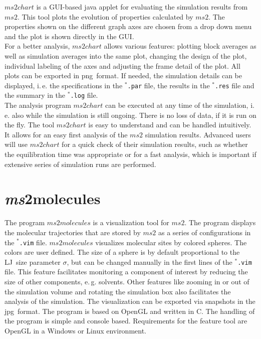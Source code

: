 $ms2chart$ is a GUI-based java applet for evaluating the simulation results from $ms2$. This tool plots the evolution of properties calculated by $ms2$. The properties shown on the different graph axes are chosen from a drop 
down menu and the plot is shown directly in the GUI. \\
For a better analysis, $ms2chart$ allows various features: plotting block averages as well as simulation averages into the same plot, changing the design of the plot, individual labeling of the axes and adjusting the frame detail of the plot. All plots can be exported in png~format. If needed, the simulation details can be displayed, i.\,e. the specifications in the \texttt{$^{*}$\hspace{-3pt}.par} file, the results in the \texttt{$^{*}$\hspace{-3pt}.res} file and the summary in the \texttt{$^{*}$\hspace{-3pt}.log} file. \\
The analysis program $ms2chart$ can be executed at any time of the simulation, i.\,e. also while the simulation is still ongoing. There is no loss of data, if it is run on the fly. The tool $ms2chart$ is easy to understand and can be handled intuitively. It allows for an easy first analysis of the $ms2$ simulation results. Advanced users will use $ms2chart$ for a quick check of their simulation results, such as whether the equilibration time was appropriate or for a fast analysis, which is important if extensive series of simulation runs are performed.


\section{\textit{ms}2molecules}
\label{sec:ms2molecules}
 

The program $ms2molecules$ is a visualization tool for $ms2$. The program displays the molecular trajectories that are stored by $ms2$ as a series of configurations in the \texttt{$^{*}$\hspace{-3pt}.vim} file. $ms2molecules$ visualizes molecular sites by colored spheres. The colors are user defined. The size of a sphere is by default proportional to the LJ~size parameter $\sigma$, but can be changed manually in the first lines of the \texttt{$^{*}$\hspace{-3pt}.vim} file. This feature facilitates monitoring a component of interest by reducing the size of other components, e.\,g. solvents. Other features like zooming in or out of the simulation volume and rotating the simulation box also facilitates the analysis of the simulation. The visualization can be exported via snapshots in the jpg~format. The program is based on OpenGL and written in C. The handling of the program is simple and console based. Requirements for the feature tool are OpenGL in a Windows or Linux environment.

